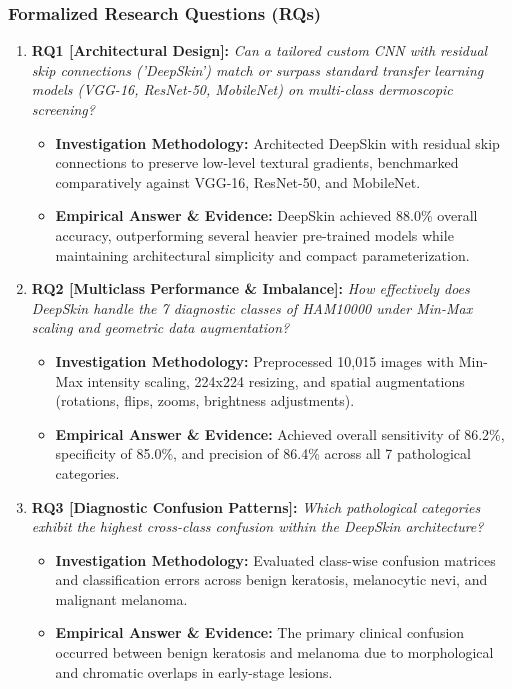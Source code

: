 \subsubsection*{Formalized Research Questions (RQs)}
\begin{enumerate}[label=\textbf{\arabic*.}, leftmargin=*]
  \item \textbf{RQ1 [Architectural Design]:} \textit{Can a tailored custom CNN with residual skip connections ('DeepSkin') match or surpass standard transfer learning models (VGG-16, ResNet-50, MobileNet) on multi-class dermoscopic screening?}
  \begin{itemize}[leftmargin=1.5em]
    \item \textbf{Investigation Methodology:} Architected DeepSkin with residual skip connections to preserve low-level textural gradients, benchmarked comparatively against VGG-16, ResNet-50, and MobileNet.
    \item \textbf{Empirical Answer \& Evidence:} DeepSkin achieved 88.0\% overall accuracy, outperforming several heavier pre-trained models while maintaining architectural simplicity and compact parameterization.
  \end{itemize}
  \item \textbf{RQ2 [Multiclass Performance \& Imbalance]:} \textit{How effectively does DeepSkin handle the 7 diagnostic classes of HAM10000 under Min-Max scaling and geometric data augmentation?}
  \begin{itemize}[leftmargin=1.5em]
    \item \textbf{Investigation Methodology:} Preprocessed 10,015 images with Min-Max intensity scaling, 224x224 resizing, and spatial augmentations (rotations, flips, zooms, brightness adjustments).
    \item \textbf{Empirical Answer \& Evidence:} Achieved overall sensitivity of 86.2\%, specificity of 85.0\%, and precision of 86.4\% across all 7 pathological categories.
  \end{itemize}
  \item \textbf{RQ3 [Diagnostic Confusion Patterns]:} \textit{Which pathological categories exhibit the highest cross-class confusion within the DeepSkin architecture?}
  \begin{itemize}[leftmargin=1.5em]
    \item \textbf{Investigation Methodology:} Evaluated class-wise confusion matrices and classification errors across benign keratosis, melanocytic nevi, and malignant melanoma.
    \item \textbf{Empirical Answer \& Evidence:} The primary clinical confusion occurred between benign keratosis and melanoma due to morphological and chromatic overlaps in early-stage lesions.

\end{itemize}
\end{enumerate}

